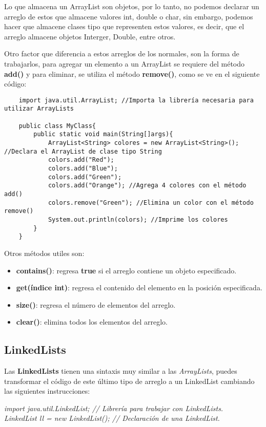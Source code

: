 Lo que almacena un ArrayList son objetos, por lo tanto, no podemos declarar un arreglo de estos que almacene valores int, double o char, sin embargo, podemos hacer que almacene clases tipo que representen estos valores, es decir, que el arreglo almacene objetos Interger, Double, entre otros.

Otro factor que diferencia a estos arreglos de los normales, son la forma de trabajarlos, para agregar un elemento a un ArrayList se requiere del método \textbf{add()} y para eliminar, se utiliza el método \textbf{remove()}, como se ve en el siguiente código:
\begin{lstlisting}
    import java.util.ArrayList; //Importa la librería necesaria para utilizar ArrayLists
    
    public class MyClass{
        public static void main(String[]args){
            ArrayList<String> colores = new ArrayList<String>(); //Declara el ArrayList de clase tipo String
            colors.add("Red");
            colors.add("Blue");
            colors.add("Green");
            colors.add("Orange"); //Agrega 4 colores con el método add()
            colors.remove("Green"); //Elimina un color con el método remove()
            System.out.println(colors); //Imprime los colores
        }
    }
\end{lstlisting}

Otros métodos utiles son:
\begin{itemize}
    \item \textbf{contains()}: regresa \textbf{true} si el arreglo contiene un objeto especificado.
    \item \textbf{get(índice int)}: regresa el contenido del elemento en la posición especificada. 
    \item \textbf{size()}: regresa el número de elementos del arreglo.
    \item \textbf{clear()}: elimina todos los elementos del arreglo.
\end{itemize}


\subsection{LinkedLists}
\hspace{0.55cm}Las \textbf{LinkedLists} tienen una sintaxis muy similar a las \textit{ArrayLists}, puedes transformar el código de este último tipo de arreglo a un LinkedList cambiando las siguientes instrucciones:
\begin{center}
    \textit{
        import java.util.LinkedList; // Librería para trabajar con LinkedLists. \\
        LinkedList ll = new LinkedList(); // Declaración de una LinkedList.
    }
\end{center}

